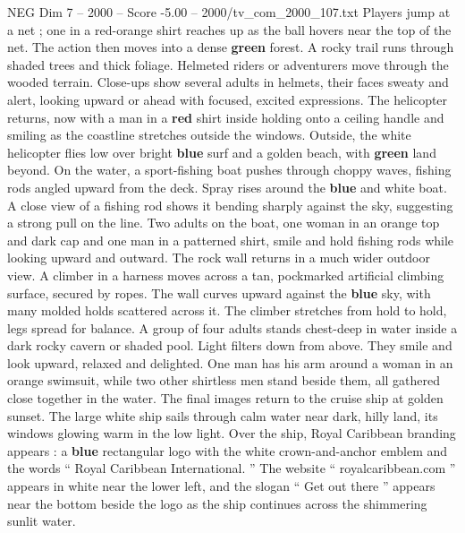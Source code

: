 \begin{textsample}{NEG Dim 7 – 2000 – Score -5.00 – 2000/tv\_com\_2000\_107.txt}
Players jump at a net ; one in a red-orange shirt reaches up as the ball hovers near the top of the net.
The action then moves into a dense \textbf{green} forest.
A rocky trail runs through shaded trees and thick foliage.
Helmeted riders or adventurers move through the wooded terrain.
Close-ups show several adults in helmets, their faces sweaty and alert, looking upward or ahead with focused, excited expressions.
The helicopter returns, now with a man in a \textbf{red} shirt inside holding onto a ceiling handle and smiling as the coastline stretches outside the windows.
Outside, the white helicopter flies low over bright \textbf{blue} surf and a golden beach, with \textbf{green} land beyond.
On the water, a sport-fishing boat pushes through choppy waves, fishing rods angled upward from the deck.
Spray rises around the \textbf{blue} and white boat.
A close view of a fishing rod shows it bending sharply against the sky, suggesting a strong pull on the line.
Two adults on the boat, one woman in an orange top and dark cap and one man in a patterned shirt, smile and hold fishing rods while looking upward and outward.
The rock wall returns in a much wider outdoor view.
A climber in a harness moves across a tan, pockmarked artificial climbing surface, secured by ropes.
The wall curves upward against the \textbf{blue} sky, with many molded holds scattered across it.
The climber stretches from hold to hold, legs spread for balance.
A group of four adults stands chest-deep in water inside a dark rocky cavern or shaded pool.
Light filters down from above.
They smile and look upward, relaxed and delighted.
One man has his arm around a woman in an orange swimsuit, while two other shirtless men stand beside them, all gathered close together in the water.
The final images return to the cruise ship at golden sunset.
The large white ship sails through calm water near dark, hilly land, its windows glowing warm in the low light.
Over the ship, Royal Caribbean branding appears : a \textbf{blue} rectangular logo with the white crown-and-anchor emblem and the words “ Royal Caribbean International. ” The website “ royalcaribbean.com ” appears in white near the lower left, and the slogan “ Get out there ” appears near the bottom beside the logo as the ship continues across the shimmering sunlit water.

\end{textsample}
